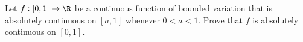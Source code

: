 Let $f:[0,1]\rightarrow \R$ be a continuous function of bounded
variation that is absolutely continuous on $[a,1]$ whenever $0<a<1$.
Prove that $f$ is absolutely continuous on $[0,1]$. 
